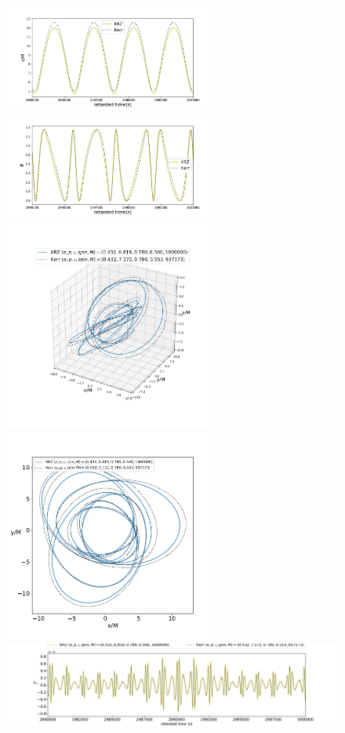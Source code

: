 \documentclass{article}
\begin{document}
\begin{figure}[!ht]
	\centering
	\includegraphics[width=7cm]{r3d.pdf}
	\includegraphics[width=7cm]{th3d.pdf}
	\includegraphics[width=7cm]{trace3d.pdf}
	\includegraphics[width=7cm]{tracexy.pdf}
	\includegraphics[width=14cm]{wave_d102.pdf}
	

\end{figure}
\end{document}
